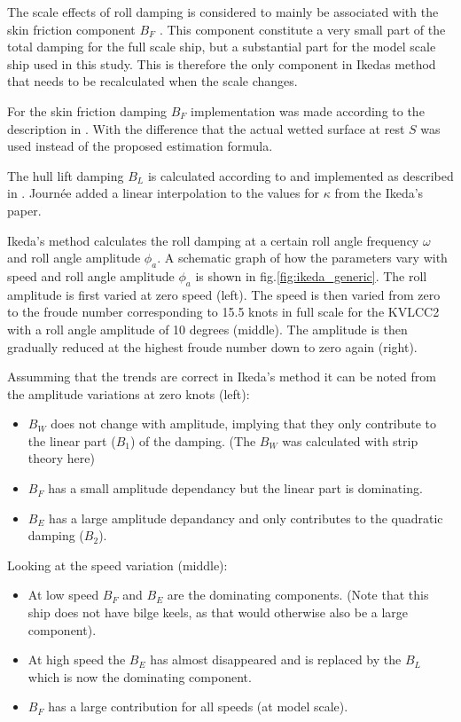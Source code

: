 The scale effects of roll damping is considered to mainly be associated
with the skin friction component $B_F$ \cite{7505983/FB64RGPF}. This
component constitute a very small part of the total damping for the full
scale ship, but a substantial part for the model scale ship used in this
study. This is therefore the only component in Ikedas method that needs
to be recalculated when the scale changes.

For the skin friction damping $B_F$ implementation was made according
to the description in \cite{7505983/UGK6YEVD}. With the difference that
the actual wetted surface at rest $S$ was used instead of the proposed
estimation formula.

The hull lift damping $B_L$ is calculated according to
\cite{7505983/937PN5DT} and implemented as described in
\cite{7505983/UYUAYY7E}. Journ\'ee added a linear interpolation to the
values for $\kappa$ from the Ikeda's paper.

Ikeda's method calculates the roll damping at a certain roll angle
frequency $\omega$ and roll angle amplitude $\phi_a$. A schematic
graph of how the parameters vary with speed and roll angle amplitude
$\phi_a$ is shown in fig.\ref{fig:ikeda_generic}. The roll
amplitude is first varied at zero speed (left). The speed is then varied
from zero to the froude number corresponding to 15.5 knots in full scale
for the KVLCC2 with a roll angle amplitude of 10 degrees (middle). The
amplitude is then gradually reduced at the highest froude number down to
zero again (right).

Assumming that the trends are correct in Ikeda's method it can be noted
from the amplitude variations at zero knots (left):

\begin{itemize}
\item $B_W$ does not change with amplitude, implying that they only contribute to the linear part ($B_1$) of the damping. (The $B_W$ was calculated with strip theory here)
\item $B_F$ has a small amplitude dependancy but the linear part is dominating.
\item $B_E$ has a large amplitude depandancy and only contributes to the quadratic damping ($B_2$)\cite{7505983/4AFVVGNT}.
\end{itemize}

Looking at the speed variation (middle):

\begin{itemize}
\item At low speed $B_F$ and $B_E$ are the dominating components. (Note that this ship does not have bilge keels, as that would otherwise also be a large component).
\item At high speed the $B_E$ has almost disappeared and is replaced by the $B_L$ which is now the dominating component.
\item $B_F$ has a large contribution for all speeds (at model scale).
\end{itemize}

